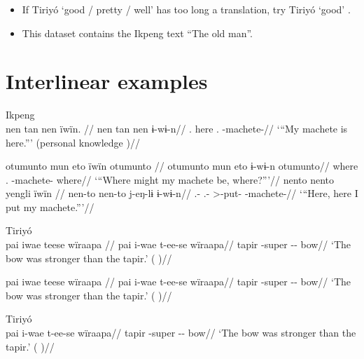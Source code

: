 \documentclass{article}
\begin{document}
\begin{itemize}
\item
  If Tiriyó  `good / pretty / well'
  \parencites[345]{triomeira1999} has too long a translation, try Tiriyó
   `good' \parencites[345]{triomeira1999}.
\item
  This dataset contains the Ikpeng text ``The old man''.
\end{itemize}

\section{Interlinear examples}

\ex  Ikpeng  \\\label{ekiri-13}
\begingl \glpreamble nen tan nen ïwïn. //
\gla nen tan nen ɨ-wɨ-n//
\glb {}. here . -machete-//
\glft ‘“My machete is here.”’ (personal knowledge
)//
\endgl
\xe

\pex\label{}    \a     \label{ekiri-9}        \begingl
        \glpreamble otumunto mun eto ïwïn otumunto //
        \gla otumunto mun eto ɨ-wɨ-n otumunto//
        \glb where .  -machete- where//
            \glft ‘“Where might my machete be, where?”’//  
        \endgl 
    \a     \label{ekiri-10}        \begingl
        \glpreamble nento nento yengli ïwïn //
        \gla nen-to nen-to j-eŋ-lɨ ɨ-wɨ-n//
        \glb {}.- .- >-put- -machete-//
            \glft ‘“Here, here I put my machete.”’//  
        \endgl 
\xe

\ex  Tiriyó  \\\label{tri-1}
\begingl \glpreamble pai iwae teese wïraapa //
\gla pai i-wae t-ee-se wïraapa//
\glb tapir -super -- bow//
\glft ‘The bow was stronger than the tapir.’ (\cite[420]{triomeira1999}
)//
\endgl
\xe

\ex \label{tri-1}
\begingl \glpreamble pai iwae teese wïraapa //
\gla pai i-wae t-ee-se wïraapa//
\glb tapir -super -- bow//
\glft ‘The bow was stronger than the tapir.’ (\cite[420]{triomeira1999}
)//
\endgl
\xe

\ex  Tiriyó  \\\label{tri-1}
\begingl 
\gla pai i-wae t-ee-se wïraapa//
\glb tapir -super -- bow//
\glft ‘The bow was stronger than the tapir.’ (\cite[420]{triomeira1999}
)//
\endgl
\xe
\end{document}
